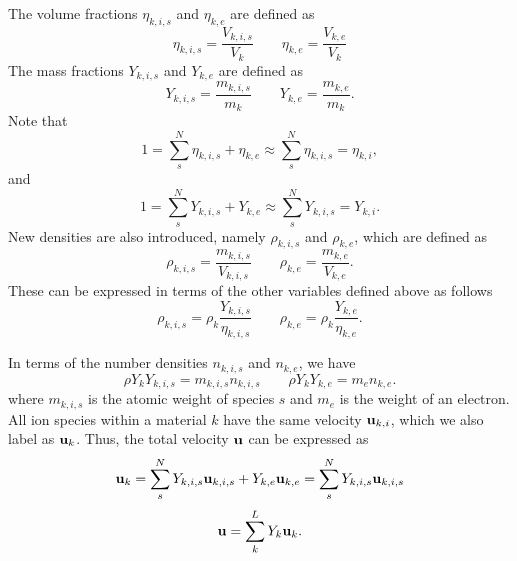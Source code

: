\documentclass[a4paper,11pt]{report}
\begin{document}
The volume fractions $\eta_{k,i,s}$ and $\eta_{k,e}$ are defined as 
\begin{equation}
    \eta_{k,i,s} = \frac{V_{k,i,s}}{V_k} \qquad \eta_{k,e} = \frac{V_{k,e}}{V_k}
\end{equation}
The mass fractions $Y_{k,i,s}$ and $Y_{k,e}$ are defined as
\begin{equation}
    Y_{k,i,s} = \frac{m_{k,i,s}}{m_k} \qquad Y_{k,e} = \frac{m_{k,e}}{m_k}.
\end{equation}
Note that
\begin{equation}
    1 = \sum_s^N \eta_{k,i,s} + \eta_{k,e} \approx \sum_s^N \eta_{k,i,s} = \eta_{k,i},
\end{equation}
and
\begin{equation}
    1 = \sum_s^N Y_{k,i,s} + Y_{k,e} \approx \sum_s^N Y_{k,i,s} = Y_{k,i}.
\end{equation}
New densities are also introduced, namely $\rho_{k,i,s}$ and $\rho_{k,e}$, which are defined as
\begin{equation}
    \rho_{k,i,s}= \frac{m_{k,i,s}}{V_{k,i,s}} \qquad \rho_{k,e}= \frac{m_{k,e}}{V_{k,e}}.
\end{equation}
These can be expressed in terms of the other variables defined above as follows
\begin{equation}
    \rho_{k,i,s} = \rho_k \frac{Y_{k,i,s}}{\eta_{k,i,s}} \qquad \rho_{k,e} = \rho_k \frac{Y_{k,e}}{\eta_{k,e}}.
\end{equation}

In terms of the number densities $n_{k,i,s}$ and $n_{k,e}$, we have
\begin{equation}
    \label{eq:mm_mass_number_densities}
    \rho Y_k Y_{k,i,s} = m_{k,i,s} n_{k,i,s} \qquad \rho Y_k Y_{k,e} = m_e n_{k,e}.
\end{equation}
where $m_{k,i,s}$ is the atomic weight of species $s$ and $m_e$ is the weight of an electron. All ion species within a material $k$ have the same velocity $\mathbf{u}_{k,i}$, which we also label as $\mathbf{u}_k$. Thus, the total velocity $\mathbf{u}$ can be expressed as
\begin{equation}
    \mathbf{u}_k = \sum_s^N Y_{k,i,s} \mathbf{u}_{k,i,s} + Y_{k,e} \mathbf{u}_{k,e} = \sum_s^N Y_{k,i,s} \mathbf{u}_{k,i,s}
\end{equation}
\begin{equation}
    \mathbf{u} = \sum_k^L Y_k \mathbf{u}_k.
\end{equation}
\end{document}
